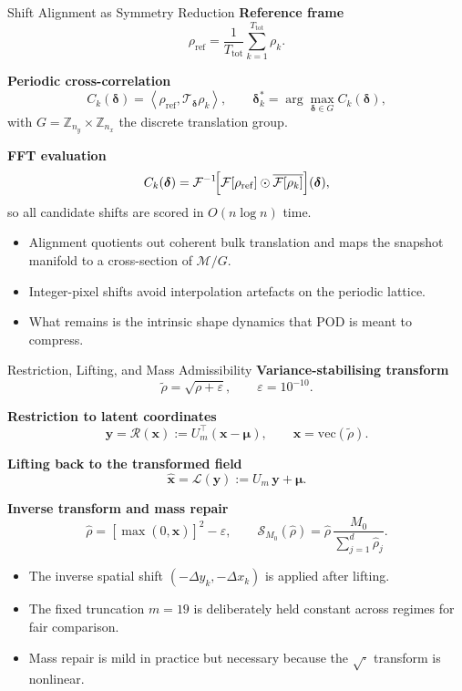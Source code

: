 \begin{frame}[shrink=12]{Shift Alignment as Symmetry Reduction}
\small
\textbf{Reference frame}
\[
  \rho_{\mathrm{ref}}
  =
  \frac{1}{T_{\mathrm{tot}}}\sum_{k=1}^{T_{\mathrm{tot}}}\rho_k .
\]

\textbf{Periodic cross-correlation}
\[
  C_k(\boldsymbol{\delta})
  =
  \left\langle
    \rho_{\mathrm{ref}},
    \mathcal{T}_{\boldsymbol{\delta}}\rho_k
  \right\rangle,
  \qquad
  \boldsymbol{\delta}_k^*
  =
  \arg\max_{\boldsymbol{\delta}\in G} C_k(\boldsymbol{\delta}),
\]
with $G=\mathbb{Z}_{n_y}\times\mathbb{Z}_{n_x}$ the discrete translation group.

\textbf{FFT evaluation}
\[
  C_k(\boldsymbol{\delta})
  =
  \mathcal{F}^{-1}\!\Bigl[
    \mathcal{F}[\rho_{\mathrm{ref}}]
    \odot
    \overline{\mathcal{F}[\rho_k]}
  \Bigr](\boldsymbol{\delta}),
\]
so all candidate shifts are scored in $O(n\log n)$ time.

\medskip
\begin{itemize}
  \item Alignment quotients out coherent bulk translation and maps the snapshot manifold to a cross-section of $\mathcal{M}/G$.
  \item Integer-pixel shifts avoid interpolation artefacts on the periodic lattice.
  \item What remains is the intrinsic shape dynamics that POD is meant to compress.
\end{itemize}
\end{frame}

\begin{frame}[shrink=10]{Restriction, Lifting, and Mass Admissibility}
\small
\textbf{Variance-stabilising transform}
\[
  \tilde\rho = \sqrt{\rho+\varepsilon},
  \qquad
  \varepsilon = 10^{-10}.
\]

\textbf{Restriction to latent coordinates}
\[
  \mathbf{y}
  =
  \mathcal{R}(\mathbf{x})
  :=
  U_m^\top(\mathbf{x}-\boldsymbol{\mu}),
  \qquad
  \mathbf{x}=\mathrm{vec}(\tilde\rho).
\]

\textbf{Lifting back to the transformed field}
\[
  \hat{\mathbf{x}}
  =
  \mathcal{L}(\mathbf{y})
  :=
  U_m\,\mathbf{y}+\boldsymbol{\mu}.
\]

\textbf{Inverse transform and mass repair}
\[
  \hat\rho = [\max(0,\hat{\mathbf{x}})]^2-\varepsilon,
  \qquad
  \mathcal{S}_{M_0}(\hat\rho)
  =
  \hat\rho\,
  \frac{M_0}{\sum_{j=1}^{d}\hat\rho_j}.
\]

\begin{itemize}
  \item The inverse spatial shift $(-\Delta y_k,-\Delta x_k)$ is applied after lifting.
  \item The fixed truncation $m=19$ is deliberately held constant across regimes for fair comparison.
  \item Mass repair is mild in practice but necessary because the $\sqrt{\cdot}$ transform is nonlinear.
 \end{itemize}
\end{frame}
\fi

